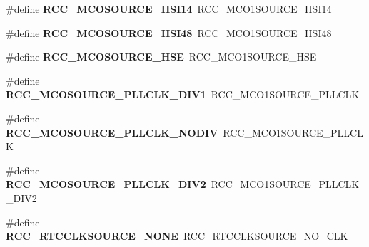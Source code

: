 \begin{DoxyCompactItemize}
\#define {\bfseries R\+C\+C\+\_\+\+M\+C\+O\+S\+O\+U\+R\+C\+E\+\_\+\+H\+S\+I14}~R\+C\+C\+\_\+\+M\+C\+O1\+S\+O\+U\+R\+C\+E\+\_\+\+H\+S\+I14
\item 
\mbox{\label{group___h_a_l___r_c_c___aliased_ga31f756beeaf0bcc8082ec46ff42cfb2c}} 
\#define {\bfseries R\+C\+C\+\_\+\+M\+C\+O\+S\+O\+U\+R\+C\+E\+\_\+\+H\+S\+I48}~R\+C\+C\+\_\+\+M\+C\+O1\+S\+O\+U\+R\+C\+E\+\_\+\+H\+S\+I48
\item 
\mbox{\label{group___h_a_l___r_c_c___aliased_ga4e6a5a2c5b38b11470c34f9adc4adb5a}} 
\#define {\bfseries R\+C\+C\+\_\+\+M\+C\+O\+S\+O\+U\+R\+C\+E\+\_\+\+H\+SE}~R\+C\+C\+\_\+\+M\+C\+O1\+S\+O\+U\+R\+C\+E\+\_\+\+H\+SE
\item 
\mbox{\label{group___h_a_l___r_c_c___aliased_ga962bbca249325c15747b0b49c47a378c}} 
\#define {\bfseries R\+C\+C\+\_\+\+M\+C\+O\+S\+O\+U\+R\+C\+E\+\_\+\+P\+L\+L\+C\+L\+K\+\_\+\+D\+I\+V1}~R\+C\+C\+\_\+\+M\+C\+O1\+S\+O\+U\+R\+C\+E\+\_\+\+P\+L\+L\+C\+LK
\item 
\mbox{\label{group___h_a_l___r_c_c___aliased_ga8f2e0c2303a5c5c53a64a60f6900b09e}} 
\#define {\bfseries R\+C\+C\+\_\+\+M\+C\+O\+S\+O\+U\+R\+C\+E\+\_\+\+P\+L\+L\+C\+L\+K\+\_\+\+N\+O\+D\+IV}~R\+C\+C\+\_\+\+M\+C\+O1\+S\+O\+U\+R\+C\+E\+\_\+\+P\+L\+L\+C\+LK
\item 
\mbox{\label{group___h_a_l___r_c_c___aliased_ga0c689edb9d017b7498258d5e9a9cf5f6}} 
\#define {\bfseries R\+C\+C\+\_\+\+M\+C\+O\+S\+O\+U\+R\+C\+E\+\_\+\+P\+L\+L\+C\+L\+K\+\_\+\+D\+I\+V2}~R\+C\+C\+\_\+\+M\+C\+O1\+S\+O\+U\+R\+C\+E\+\_\+\+P\+L\+L\+C\+L\+K\+\_\+\+D\+I\+V2
\item 
\mbox{\label{group___h_a_l___r_c_c___aliased_ga7ac4762e5f4ebe4a04aea58edc9c46a9}} 
\#define {\bfseries R\+C\+C\+\_\+\+R\+T\+C\+C\+L\+K\+S\+O\+U\+R\+C\+E\+\_\+\+N\+O\+NE}~\hyperlink{group___r_c_c___r_t_c___clock___source_gacce0b2f54d103340d8c3a218e86e295d}{R\+C\+C\+\_\+\+R\+T\+C\+C\+L\+K\+S\+O\+U\+R\+C\+E\+\_\+\+N\+O\+\_\+\+C\+LK}
\item 
\mbox{\label{group___h_a_l___r_c_c___aliased_gad3aae66d6569b04d04517ea523ce6e9e}} 

\end{DoxyCompactItemize}
